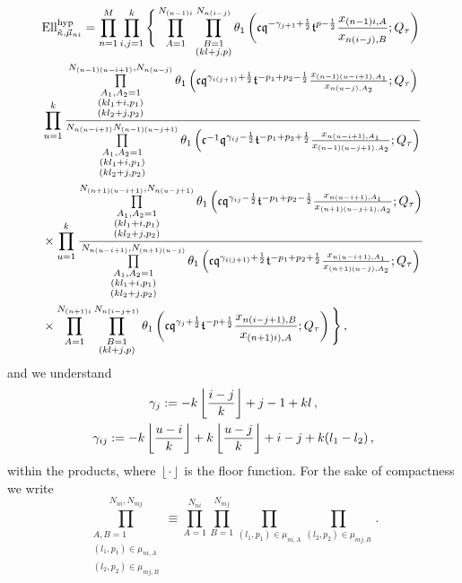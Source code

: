 \documentclass[main.tex]{subfiles}
\begin{document}
\begin{align*}\allowdisplaybreaks
&\Ell_{\tilde{\kappa},\vec{\mu}_{ni}}^{\text{hyp}}=\prod_{n=1}^M\prod_{i,j=1}^k\Bigg\{\prod\limits_{A=1}^{N_{(n-1)i}}\prod\limits_{\substack{B=1\\(kl+j,p)}}^{N_{n(i-j)}}\theta_1\left(\cbf\qbf^{-\gamma_{j+1}+\frac{1}{2}}\tbf^{p-\frac{1}{2}}\frac{x_{(n-1)i,A}}{x_{n(i-j),B}};\Qtau\right)\\
&\prod_{u=1}^k\frac{\prod\limits_{\substack{A_1,A_2=1\\(kl_1+i,p_1)\\(kl_2+j,p_2)}}^{N_{(n-1)(u-i+1)},N_{n(u-j)}}\theta_1\left(\cbf\qbf^{\gamma_{i(j+1)}+\frac{1}{2}}\tbf^{-p_1+p_2-\frac{1}{2}}\frac{x_{(n-1)(u-i+1),A_1}}{x_{n(u-j),A_2}};\Qtau\right)}{\prod\limits_{\substack{A_1,A_2=1\\(kl_1+i,p_1)\\(kl_2+j,p_2)}}^{N_{n(u-i+1)}N_{(n-1)(u-j+1)}}\theta_1\left(\cbf^{-1}\qbf^{\gamma_{ij}-\frac{1}{2}}\tbf^{-p_1+p_2+\frac{1}{2}}\frac{x_{n(u-i+1),A_1}}{x_{(n-1)(u-j+1),A_2}};\Qtau\right)}\\
&\times\prod_{u=1}^k\frac{\prod\limits_{\substack{A_1,A_2=1\\(kl_1+i,p_1)\\(kl_2+j,p_2)}}^{N_{(n+1)(u-i+1)},N_{n(u-j+1)}}\theta_1\left(\cbf\qbf^{\gamma_{ij}-\frac{1}{2}}\tbf^{-p_1+p_2-\frac{1}{2}}\frac{x_{n(u-i+1),A_1}}{x_{(n+1)(u-j+1),A_2}};\Qtau\right)}{\prod\limits_{\substack{A_1,A_2=1\\(kl_1+i,p_1)\\(kl_2+j,p_2)}}^{N_{n(u-i+1)},N_{(n+1)(u-j)}}\theta_1\left(\cbf\qbf^{\gamma_{i(j+1)}+\frac{1}{2}}\tbf^{-p_1+p_2+\frac{1}{2}}\frac{x_{n(u-i+1),A_1}}{x_{(n+1)(u-j),A_2}};\Qtau\right)}\\
&\times\prod\limits_{A=1}^{N_{(n+1)i}}\prod\limits_{\substack{B=1\\(kl+j,p)}}^{N_{n(i-j+1)}}\theta_1\left(\cbf\qbf^{\gamma_{j}+\frac{1}{2}}\tbf^{-p+\frac{1}{2}}\frac{x_{n(i-j+1),B}}{x_{(n+1)i),A}};\Qtau\right)\Bigg\}\,,
\end{align*}
and we understand
\begin{gather}
\gamma_j:=-k\left\lfloor\frac{{i-j}}{k}\right\rfloor+j-1+kl\,,\\\gamma_{ij}:=-k\left\lfloor\frac{{u-i}}{k}\right\rfloor+k\left\lfloor\frac{{u-j}}{k}\right\rfloor+i-j+k(l_1-l_2)\,,
\end{gather}
within the products, where $\left\lfloor\cdot\right\rfloor$ is the floor function. For the sake of compactness we write
\begin{equation}
\prod\limits_{\substack{{A,B=1}\\(l_1,p_1)\in \mu_{ni,A}\\(l_2,p_2)\in \mu_{mj,B}}}^{N_{ni},N_{mj}}\equiv\prod\limits_{A=1}^{N_{ni}}\prod\limits_{B=1}^{N_{mj}}\prod\limits_{(l_1,p_1)\in \mu_{ni,A}}\prod\limits_{(l_2,p_2)\in \mu_{mj,B}}\,.
\end{equation}
\end{document}
